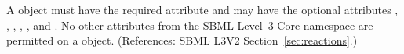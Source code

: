 A \LocalParameter object must have the required attribute  and
may have the optional attributes , , , ,
,  and .  No other attributes from
the SBML Level~3 Core namespace are permitted on a \LocalParameter object.
(References: SBML L3V2 Section~\ref{sec:reactions}.)

